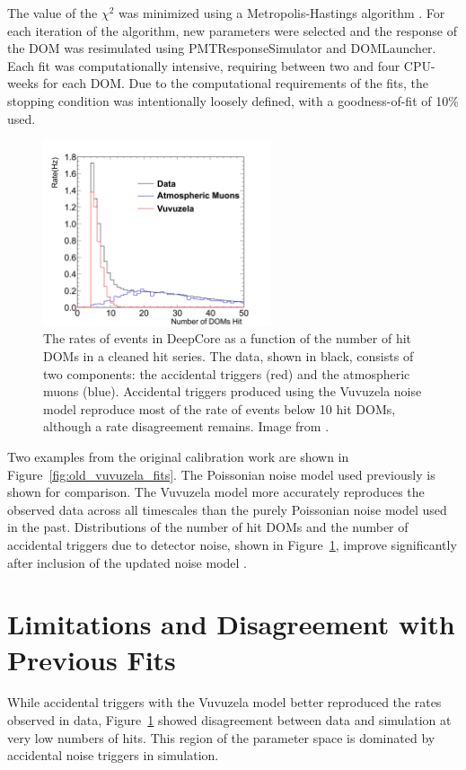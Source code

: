 The value of the $\chi^2$ was minimized using a Metropolis-Hastings algorithm \cite{PDG-2015}.
For each iteration of the algorithm, new parameters were selected and the response of the DOM was resimulated using PMTResponseSimulator and DOMLauncher.
Each fit was computationally intensive, requiring between two and four CPU-weeks for each DOM.
Due to the computational requirements of the fits, the stopping condition was intentionally loosely defined, with a goodness-of-fit of 10\% used.

\begin{figure}
\centering
\includegraphics[width=0.6\textwidth]{srtwofflinepulsesdc_withnoise_vuvuzela.png} 
\caption[Noise trigger rates with Vuvuzela V1]{The rates of events in DeepCore as a function of the number of hit DOMs in a cleaned hit series. The data, shown in black, consists of two components: the accidental triggers (red) and the atmospheric muons (blue). Accidental triggers produced using the Vuvuzela noise model reproduce most of the rate of events below 10 hit DOMs, although a rate disagreement remains. Image from \cite{Thesis-Vuvuzela}.}
\label{fig:old_nch}
\end{figure}

Two examples from the original calibration work are shown in Figure~\ref{fig:old_vuvuzela_fits}.
The Poissonian noise model used previously is shown for comparison.
The Vuvuzela model more accurately reproduces the observed data across all timescales than the purely Poissonian noise model used in the past.
Distributions of the number of hit DOMs and the number of accidental triggers due to detector noise, shown in Figure~\ref{fig:old_nch}, improve significantly after inclusion of the updated noise model \cite{Thesis-Vuvuzela}.

\section{Limitations and Disagreement with Previous Fits}
\label{sec:vuvuzela_limitations}
While accidental triggers with the Vuvuzela model better reproduced the rates observed in data, Figure~\ref{fig:old_nch} showed disagreement between data and simulation at very low numbers of hits.
This region of the parameter space is dominated by accidental noise triggers in simulation.

